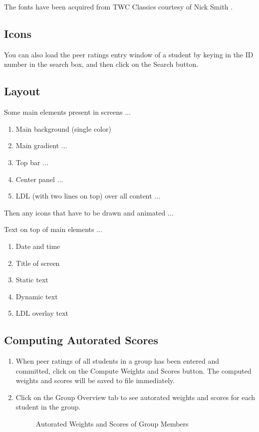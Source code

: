 \documentclass[a4paper,11pt]{refart}
\begin{document}
The fonts have been acquired from TWC Classics courtesy of Nick Smith \cite{TWCClassicsDownloads}.

\subsection{Icons}

You can also load the peer ratings entry window of a student by keying in the ID number in the search box, and then click on the Search button.

\subsection{Layout}

Some main elements present in screens ...

\begin{enumerate}
\item Main background (single color)
\item Main gradient ...
\item Top bar ...
\item Center panel ...
\item LDL (with two lines on top) over all content ...
\end{enumerate}

Then any icons that have to be drawn and animated ...

Text on top of main elements ...

\begin{enumerate}
\item Date and time
\item Title of screen
\item Static text
\item Dynamic text
\item LDL overlay text
\end{enumerate}

\subsection{Computing Autorated Scores}
\begin{enumerate}
\item When peer ratings of all students in a group has been entered and committed, click on the Compute Weights and Scores button. The computed weights and scores will be saved to file immediately.
\item Click on the Group Overview tab to see autorated weights and scores for each student in the group.

\begin{figure}[hbt!]
\caption{Autorated Weights and Scores of Group Members}
\end{figure}

\end{enumerate}
\end{document}
